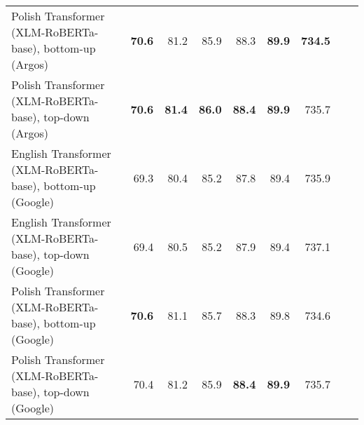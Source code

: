 \begin{table}[ht!]
{\begin{tabular}{lrrrrrrrr}
  Polish Transformer (XLM-RoBERTa-base), bottom-up (Argos) & \textbf{70.6} & 81.2 & 85.9 & 88.3 & \textbf{89.9} & \textbf{734.5} \\ 
  Polish Transformer (XLM-RoBERTa-base), top-down (Argos) & \textbf{70.6} & \textbf{81.4} & \textbf{86.0} & \textbf{88.4} & \textbf{89.9} & 735.7 \\ 
  English Transformer (XLM-RoBERTa-base), bottom-up (Google) & 69.3 & 80.4 & 85.2 & 87.8 & 89.4 & 735.9 \\ 
  English Transformer (XLM-RoBERTa-base), top-down (Google) & 69.4 & 80.5 & 85.2 & 87.9 & 89.4 & 737.1 \\ 
  Polish Transformer (XLM-RoBERTa-base), bottom-up (Google) & \textbf{70.6} & 81.1 & 85.7 & 88.3 & 89.8 & 734.6 \\ 
  Polish Transformer (XLM-RoBERTa-base), top-down (Google) & 70.4 & 81.2 & 85.9 & \textbf{88.4} & \textbf{89.9} & 735.7 \\ 
   \hline
\end{tabular}
}
\end{table}




